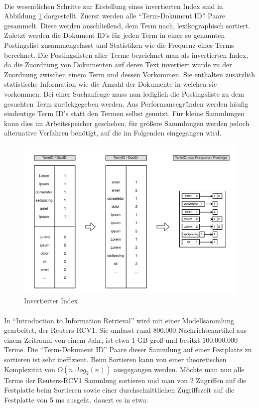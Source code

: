 \paragraph{}
Die wesentlichen Schritte zur Erstellung eines invertierten Index sind in Abbildung \ref{postingssList} dargestellt. Zuerst werden alle \enquote{Term-Dokument ID} Paare gesammelt. Diese werden anschließend, dem Term nach, lexikographisch sortiert. Zuletzt werden die Dokument ID's für jeden Term in einer so genannten Postingslist zusammengefasst und Statistiken wie die Frequenz eines Terms berechnet. Die Postingslisten aller Terme bezeichnet man als invertierten Index, da die Zuordnung von Dokumenten auf deren Text invertiert wurde zu der Zuordnung zwischen einem Term und dessen Vorkommen. Sie enthalten zusätzlich statistische Information wie die Anzahl der Dokumente in welchen sie vorkommen. Bei einer Suchanfrage muss nun lediglich die Postingsliste zu dem gesuchten Term zurückgegeben werden. Aus Performancegründen werden häufig eindeutige Term ID's statt den Termen selbst genutzt. Für kleine Sammlungen kann dies im Arbeitsspeicher geschehen, für größere Sammlungen werden jedoch alternative Verfahren benötigt, auf die im Folgenden eingegangen wird.
\par

\begin{figure}[ht]
  \includegraphics[width=\textwidth,height=0.45\textheight]{pdf/postingslist3.pdf}
  \caption{Invertierter Index}
  \label{postingssList}
\end{figure}

\paragraph{}
In \enquote{Introduction to Information Retrieval}\cite{ir} wird mit einer Modellsammlung gearbeitet, der Reuters-RCV1. Sie umfasst rund $800.000$ Nachrichtenartikel aus einem Zeitraum von einem Jahr, ist etwa 1 GB groß und besitzt $100.000.000$ Terme. Die \enquote{Term-Dokument ID} Paare dieser Sammlung auf einer Festplatte zu sortieren ist sehr ineffizient. Beim Sortieren kann von einer theoretischen Komplexität von $O(n \cdot log_2 (n))$ ausgegangen werden. Möchte man nun alle Terme der Reuters-RCV1 Sammlung sortieren und man von 2 Zugriffen auf die Festplatte beim Sortieren sowie einer durchschnittlichen Zugriffszeit auf die Festplatte von 5 ms ausgeht, dauert es in etwa:

